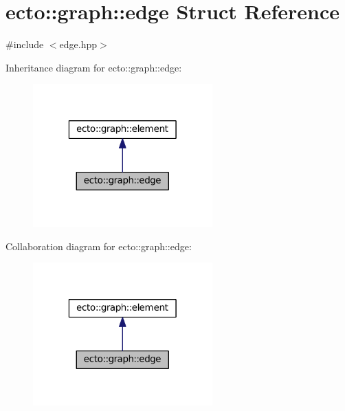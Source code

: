 \hypertarget{structecto_1_1graph_1_1edge}{\section{ecto\-:\-:graph\-:\-:edge Struct Reference}
\label{structecto_1_1graph_1_1edge}
}


{\ttfamily \#include $<$edge.\-hpp$>$}



Inheritance diagram for ecto\-:\-:graph\-:\-:edge\-:\nopagebreak
\begin{figure}[H]
\begin{center}
\leavevmode
\includegraphics[width=196pt]{structecto_1_1graph_1_1edge__inherit__graph}
\end{center}
\end{figure}


Collaboration diagram for ecto\-:\-:graph\-:\-:edge\-:\nopagebreak
\begin{figure}[H]
\begin{center}
\leavevmode
\includegraphics[width=196pt]{structecto_1_1graph_1_1edge__coll__graph}
\end{center}
\end{figure}
